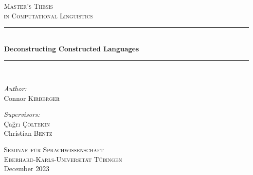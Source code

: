 \documentclass[12pt,a4paper]{article}
\numberwithin{figure}{section}
\numberwithin{table}{section}
\numberwithin{definition}{section}
\newcommand{\HRule}{\rule{\linewidth}{0.5mm}}
\begin{document}
\begin{titlepage}
\begin{center}


\textsc{\LARGE Master's Thesis}\\[0.8cm]

\textsc{\large in Computational Linguistics}\\[0.5cm]

\HRule \\[0.4cm]
{  \bfseries \fontsize{22}{37} \selectfont Deconstructing Constructed Languages}\\
\vspace{0.4em}

\HRule \\[1.5cm]



\begin{minipage}{0.4\textwidth}
\begin{flushleft} \large
\emph{Author:}\\
Connor \textsc{Kirberger}
\end{flushleft}
\end{minipage}
\begin{minipage}{0.5\textwidth}
\begin{flushright} \large
\emph{Supervisors:} \\
Çağrı \textsc{Çöltekin} \\
Christian \textsc{Bentz}\\
\end{flushright}
\end{minipage}


\vfill



\textsc{\large Seminar f\"ur Sprachwissenschaft\\Eberhard-Karls-Universit\"at T\"ubingen}\\[1.5cm]



{\large December 2023}

\end{center}
\end{titlepage}
\end{document}
